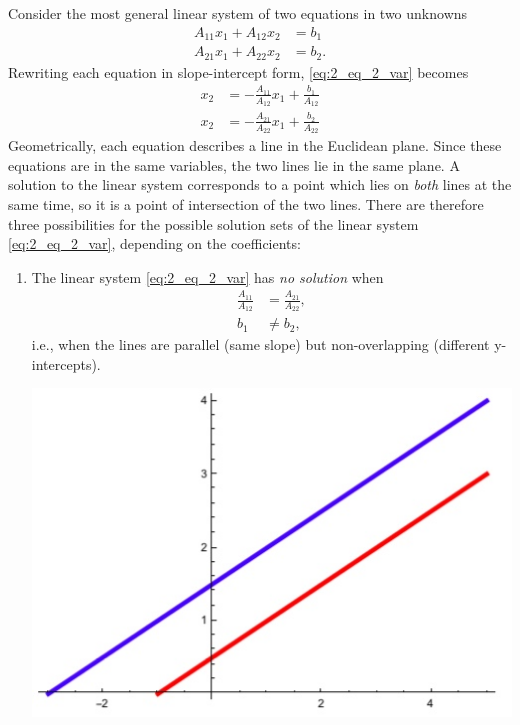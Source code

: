 \documentclass[12pt,letterpaper,reqno]{article}
\numberwithin{equation}{section}
\newcommand{\ti}[1]{\textit{#1}}
\begin{document}
\begin{example}\label{ex:two_linear_equations_in_two_unknowns}
Consider the most general linear system of two equations in two unknowns
\begin{equation}\label{eq:2_eq_2_var}
	\begin{split}
				A_{11} x_1+A_{12}x_2&=b_1 \\
		A_{21} x_1+A_{22}x_2&=b_2. 
	\end{split}
\end{equation}	
Rewriting each equation in slope-intercept form, \eqref{eq:2_eq_2_var} becomes
\begin{equation}
	\begin{split}
		x_2&=-\frac{A_{11}}{A_{12}}x_1+\frac{b_1}{A_{12}} \\
		x_2&=-\frac{A_{21}}{A_{22}}x_1+\frac{b_2}{A_{22}}
	\end{split}
\end{equation}
Geometrically, each equation describes a line in the Euclidean plane. Since these equations are in the same variables, the two lines lie in the same plane. A solution to the linear system corresponds to a point which lies on \ti{both} lines at the same time, so it is a point of intersection of the two lines. There are therefore three possibilities for the possible solution sets of the linear system \eqref{eq:2_eq_2_var}, depending on the coefficients:
\begin{enumerate}[(1)]
	\item The linear system \eqref{eq:2_eq_2_var} has \emph{no solution} when 
	\begin{align*}
		\frac{A_{11}}{A_{12}}&=\frac{A_{21}}{A_{22}}, \\
		b_1 & \neq b_2,
	\end{align*}
i.e., when the lines are parallel (same slope) but non-overlapping (different y-intercepts).
\begin{center}
\includegraphics[scale=0.5]{figures_mvc/two_lines_no_soln}
\end{center}


\end{enumerate}
\end{example}
\end{document}
